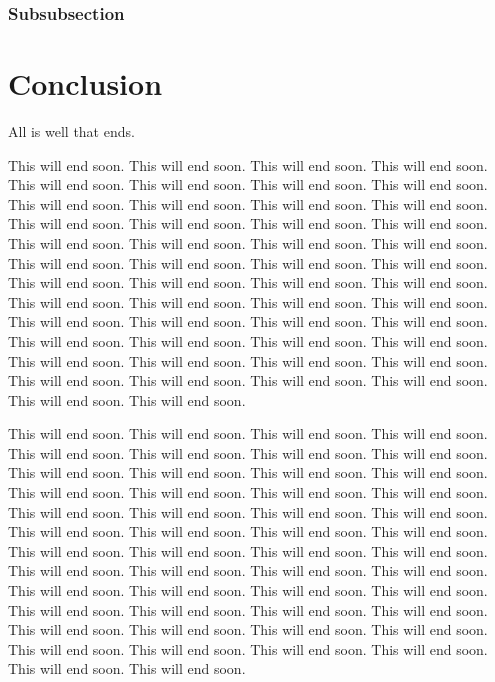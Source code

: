 \documentclass[12pt,econ]{article}
\begin{document}
\subsubsection{Subsubsection}


\section{Conclusion}

All is well that ends.

This will end soon. This will end soon. This will end soon. This will end soon. This will end soon. This will end soon. This will end soon. This will end soon. This will end soon. This will end soon. This will end soon. This will end soon. This will end soon. This will end soon. This will end soon. This will end soon. This will end soon. This will end soon. This will end soon. This will end soon. This will end soon. This will end soon. This will end soon. This will end soon. This will end soon. This will end soon. This will end soon. This will end soon. This will end soon. This will end soon. This will end soon. This will end soon. This will end soon. This will end soon. This will end soon. This will end soon. This will end soon. This will end soon. This will end soon. This will end soon. This will end soon. This will end soon. This will end soon. This will end soon. This will end soon. This will end soon. This will end soon. This will end soon. This will end soon. This will end soon. 

This will end soon. This will end soon. This will end soon. This will end soon. This will end soon. This will end soon. This will end soon. This will end soon. This will end soon. This will end soon. This will end soon. This will end soon. This will end soon. This will end soon. This will end soon. This will end soon. This will end soon. This will end soon. This will end soon. This will end soon. This will end soon. This will end soon. This will end soon. This will end soon. This will end soon. This will end soon. This will end soon. This will end soon. This will end soon. This will end soon. This will end soon. This will end soon. This will end soon. This will end soon. This will end soon. This will end soon. This will end soon. This will end soon. This will end soon. This will end soon. This will end soon. This will end soon. This will end soon. This will end soon. This will end soon. This will end soon. This will end soon. This will end soon. This will end soon. This will end soon. 
\end{document}
